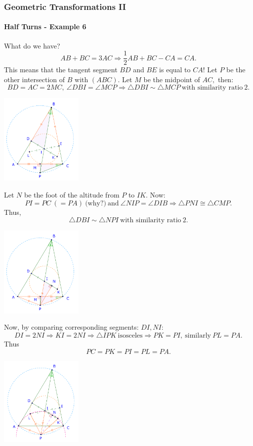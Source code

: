 \documentclass[8pt,xcolor=table,dvipsnames]{beamer}
\providecommand{\half}{\frac{1}{2}}
\begin{document}
\begin{frame}[t]
    \frametitle{Geometric Transformations II}
    \framesubtitle{Half Turns - Example 6}
    \begin{overprint}
        What do we have?
        \[ 
            AB+BC=3AC \Rightarrow \half{AB+BC-CA} = CA.
        \]
        This means that the tangent segment $BD$ and $BE$ is equal to $CA$!
        \bigbreak
        Let $P$ be the other intersection of $B$ with $(ABC).$ Let $M$ be the midpoint of $AC,$ then:
        \[
            BD = AC = 2MC,\ \angle DBI = \angle MCP \Rightarrow \triangle DBI \sim \triangle MCP\ \text{with similarity ratio}\ 2.
        \]
        \begin{center}
            \includegraphics[width=4cm]{./svg/pdf/imo-sl-2005-g1-2.pdf}
        \end{center}
        Let $N$ be the foot of the altitude from $P$ to $IK$. Now:
        \[
            PI = PC\ (= PA)\ \text{(why?)}\ \text{and}\ \angle NIP = \angle DIB \Rightarrow \triangle PNI \cong \triangle CMP.
        \]
        Thus,
        \[
            \triangle DBI \sim \triangle NPI\ \text{with similarity ratio}\ 2.
        \]
        \begin{center}
            \includegraphics[width=4cm]{./svg/pdf/imo-sl-2005-g1-3.pdf}
        \end{center}
        Now, by comparing corresponding segments: $DI, NI$:
        \[
            DI = 2 NI \Rightarrow KI = 2 NI \Rightarrow \triangle IPK\ \text{isosceles} \Rightarrow PK = PI,\ \text{similarly}\ PL = PA.
        \]
        Thus \[ PC = PK = PI = PL = PA. \]
        \begin{center}
            \includegraphics[width=4cm]{./svg/pdf/imo-sl-2005-g1-4.pdf}
        \end{center}
    \end{overprint}
\end{frame}
\end{document}
